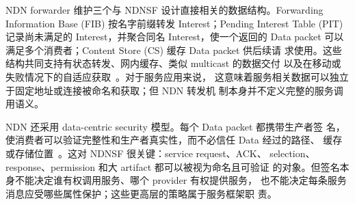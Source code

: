 NDN forwarder 维护三个与 NDNSF 设计直接相关的数据结构。Forwarding
Information Base (FIB) 按名字前缀转发 Interest；Pending Interest Table
(PIT) 记录尚未满足的 Interest，并聚合同名 Interest，使一个返回的 Data
packet 可以满足多个消费者；Content Store (CS) 缓存 Data packet 供后续请
求使用。这些结构共同支持有状态转发、网内缓存、类似 multicast 的数据交付
以及在移动或失败情况下的自适应获取~\cite{yi2013case}。对于服务应用来说，
这意味着服务相关数据可以独立于固定地址或连接被命名和获取；但 NDN 转发机
制本身并不定义完整的服务调用语义。

NDN 还采用 data-centric security 模型。每个 Data packet 都携带生产者签
名，使消费者可以验证完整性和生产者真实性，而不必信任 Data 经过的路径、
缓存或存储位置~\cite{ndn}。这对 NDNSF 很关键：service request、ACK、
selection、response、permission 和大 artifact 都可以被视为命名且可验证
的对象。但签名本身不能决定谁有权调用服务、哪个 provider 有权提供服务，
也不能决定每条服务消息应受哪些属性保护；这些更高层的策略属于服务框架职
责。


